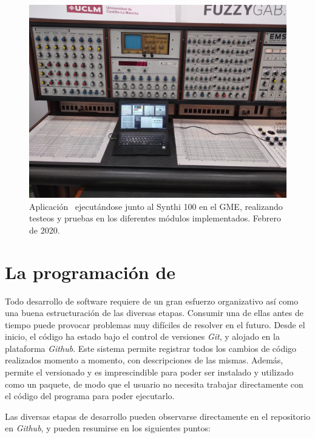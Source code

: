 \begin{figure}
	\centering
	\includegraphics[width=1\textwidth]{Synthi_Synthi}
	\caption[Aplicación \appName~ejecutándose junto al Synthi 100 en el GME]{Aplicación \appName~ejecutándose junto al Synthi 100 en el GME, realizando testeos y pruebas en los diferentes módulos implementados. Febrero de 2020.}
	\label{fig:Synthi_Synthi}
\end{figure}

\section[La programación\dots]{La programación de \appName {}}

Todo desarrollo de software requiere de un gran esfuerzo organizativo así como una buena estructuración de las diversas etapas. Consumir una de ellas antes de tiempo puede provocar problemas muy difíciles de resolver en el futuro. Desde el inicio, el código ha estado bajo el control de versiones \textit{Git}, y alojado en la plataforma \textit{Github}. Este sistema permite registrar todos los cambios de código realizados momento a momento, con descripciones de las mismas. Además, permite el versionado y es imprescindible para poder ser instalado y utilizado como un paquete, de modo que el usuario no necesita trabajar directamente con el código del programa para poder ejecutarlo.

Las diversas etapas de desarrollo pueden observarse directamente en el repositorio en \textit{Github}, y pueden resumirse en los siguientes puntos:

